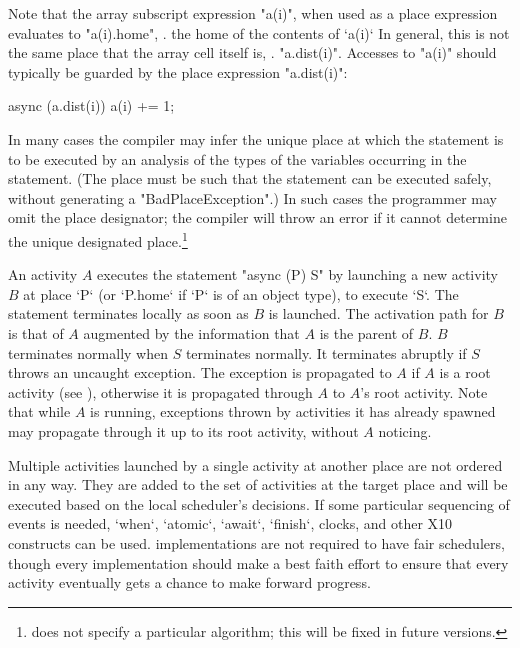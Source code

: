 Note that the array subscript expression \xcd"a(i)", when used as a place
expression evaluates to \xcd"a(i).home", \viz. the home of the contents of
\xcd`a(i)` In general, this is not the same place that the array cell itself
is, \viz. \xcd"a.dist(i)". Accesses to \xcd"a(i)" should typically be guarded
by the place expression \xcd"a.dist(i)": 
\begin{xten}
async (a.dist(i)) {
  a(i) += 1;
}
\end{xten}

In many cases the compiler may infer the unique place at which the
statement is to be executed by an analysis of the types of the
variables occurring in the statement. (The place must be such that the
statement can be executed safely, without generating a
\xcd"BadPlaceException".) In such cases the programmer may omit the
place designator; the compiler will throw an error if it cannot
determine the unique designated place.\footnote{\XtenCurrVer{} does
not specify a particular algorithm; this will be fixed in future
versions.}

An activity $A$ executes the statement \xcd"async (P) S" by launching
a new activity $B$ at place \xcd`P` (or \xcd`P.home` if \xcd`P` is of an
object type), to execute \xcd`S`. The statement terminates locally as soon as $B$ is
launched.  The activation path for $B$ is that of $A$ augmented by the
information that {$A$} is the parent of {$B$}. 
$B$
terminates normally when $S$ terminates normally.  It terminates
abruptly if $S$ throws an uncaught exception. The exception is
propagated to $A$ if $A$ is a root activity (see ),
otherwise it is propagated through $A$ to $A$'s root activity. Note that while
{$A$} is running, exceptions thrown by activities it has already
spawned may propagate through it up to its root activity, without {$A$} noticing.

Multiple activities launched by a single activity at another place are not
ordered in any way. They are added to the set of activities at the target
place and will be executed based on the local scheduler's decisions.
If some particular sequencing of events is needed, \xcd`when`, \xcd`atomic`,
\xcd`await`, \xcd`finish`, clocks, and other X10 constructs can be used.
\Xten{} implementations are not required to have fair schedulers,
though every implementation should make a best faith effort to ensure
that every activity eventually gets a chance to make forward progress.

